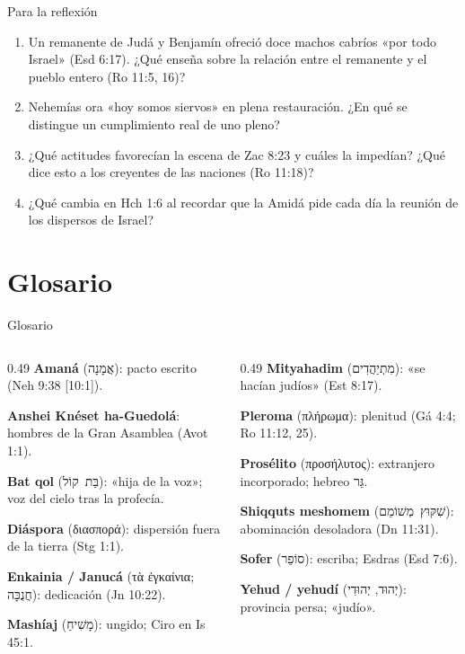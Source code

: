 \documentclass[hyperref={bookmarks=false},aspectratio=169]{beamer}
\newcommand{\heb}[1]{\mbox{\foreignlanguage{hebrew}{#1}}}
\newcommand{\grc}[1]{\foreignlanguage{ancientgreek}{#1}}
\begin{document}
\begin{frame}{Para la reflexión}
\small
\begin{enumerate}
\item Un remanente de Judá y Benjamín ofreció doce machos cabríos «por todo Israel» (Esd 6:17). ¿Qué enseña sobre la relación entre el remanente y el pueblo entero (Ro 11:5, 16)?\medskip
\item Nehemías ora «hoy somos siervos» en plena restauración. ¿En qué se distingue un cumplimiento real de uno pleno?\medskip
\item ¿Qué actitudes favorecían la escena de Zac 8:23 y cuáles la impedían? ¿Qué dice esto a los creyentes de las naciones (Ro 11:18)?\medskip
\item ¿Qué cambia en Hch 1:6 al recordar que la Amidá pide cada día la reunión de los dispersos de Israel?
\end{enumerate}
\end{frame}

\section{Glosario}
\begin{frame}{Glosario}
\begin{columns}[t,onlytextwidth]
\begin{column}{0.49\textwidth}\scriptsize
\textbf{Amaná} (\heb{אֲמָנָה}): pacto escrito (Neh 9:38 [10:1]).\par\smallskip
\textbf{Anshei Knéset ha-Guedolá}: hombres de la Gran Asamblea (Avot 1:1).\par\smallskip
\textbf{Bat qol} (\heb{בַּת קוֹל}): «hija de la voz»; voz del cielo tras la profecía.\par\smallskip
\textbf{Diáspora} (\grc{διασπορά}): dispersión fuera de la tierra (Stg 1:1).\par\smallskip
\textbf{Enkainia / Janucá} (\grc{τὰ ἐγκαίνια}; \heb{חֲנֻכָּה}): dedicación (Jn 10:22).\par\smallskip
\textbf{Mashíaj} (\heb{מָשִׁיחַ}): ungido; Ciro en Is 45:1.
\end{column}
\begin{column}{0.49\textwidth}\scriptsize
\textbf{Mityahadim} (\heb{מִתְיַהֲדִים}): «se hacían judíos» (Est 8:17).\par\smallskip
\textbf{Pleroma} (\grc{πλήρωμα}): plenitud (Gá 4:4; Ro 11:12, 25).\par\smallskip
\textbf{Prosélito} (\grc{προσήλυτος}): extranjero incorporado; hebreo \heb{גֵּר}.\par\smallskip
\textbf{Shiqquts meshomem} (\heb{שִׁקּוּץ מְשׁוֹמֵם}): abominación desoladora (Dn 11:31).\par\smallskip
\textbf{Sofer} (\heb{סוֹפֵר}): escriba; Esdras (Esd 7:6).\par\smallskip
\textbf{Yehud / yehudí} (\heb{יְהוּד}, \heb{יְהוּדִי}): provincia persa; «judío».
\end{column}
\end{columns}
\end{frame}
\end{document}
